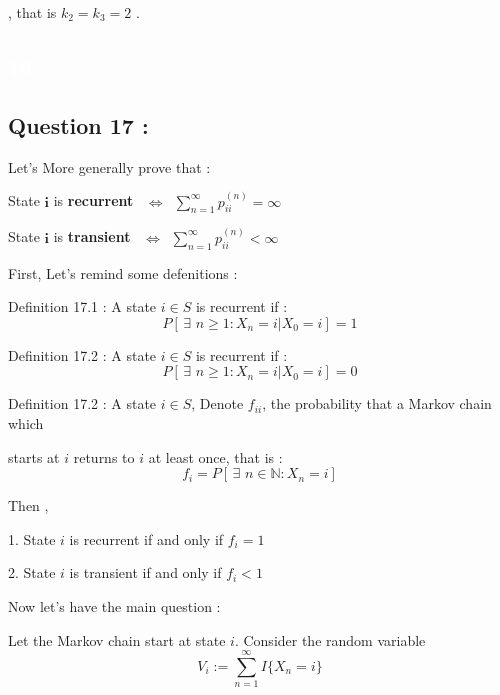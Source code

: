 \documentclass[a4paper]{article}
\begin{document}
{{	
	
	, that is $k_2 = k_3 = 2$ .
	
	{\tiny \textcolor{white}{\subsection{16}}}
	\newpage
	\subsection{{\Large Question 17 :}}
	
		Let's More generally prove that :
		\begin{center}
			State ${\mathbf i}$ is \textbf{recurrent} $ \,\,\,\Longleftrightarrow \,\,\, \sum_{n=1}^{\infty} p^{(n)}_{ii} = \infty$
			
			State ${\mathbf i}$ is \textbf{transient} $ \,\,\,\Longleftrightarrow \,\,\, \sum_{n=1}^{\infty} p^{(n)}_{ii} < \infty$
		\end{center}
	
	First, Let's remind some defenitions :
	
	Definition 17.1 : A state $i \in S$ is recurrent if : 
		\[P[\,\exists\,\, n \geq 1 : X_n=i | X_0 =i] = 1\]
		
	Definition 17.2 : A state $i \in S$ is recurrent if : 
	\[P[\,\exists\,\, n \geq 1 : X_n=i | X_0 =i] = 0\]
	
	Definition 17.2 : A state $i \in S$, Denote $f_{ii}$, the probability that a Markov chain which 
	
	starts at $i$ returns to $i$ at least once, that is :
	\[f_i = P[\,\exists\,\, n \in {\mathbb N}  : X_n = i ]\]
	
	Then , 
	
	1. State $i$ is recurrent if and only if  $f_i = 1$
	
	2. State $i$ is transient if and only if  $f_i < 1$
	
	Now let's have the main question :
	
	Let the Markov chain start at state $i$. Consider the random variable\[V_i := \sum_{n=1}^{\infty} I{\{X_n = i\}}\]
	\newpage
	
}}
\end{document}
